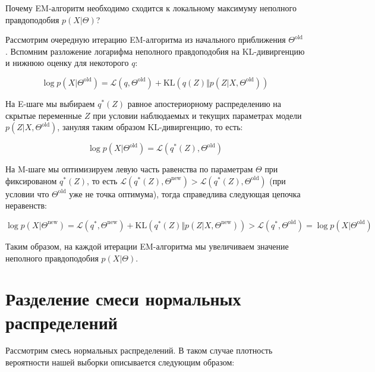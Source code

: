 \documentclass[12pt,a4paper]{article}
\begin{document}
\begin{vkProblem}
    Почему EM-алгоритм необходимо сходится к локальному максимуму неполного правдоподобия $p(X\vert\Theta)$?
\end{vkProblem}
\begin{esSolution}
    Рассмотрим очередную итерацию EM-алгоритма из начального приближения $\Theta^{\text{old}}$. Вспомним разложение логарифма неполного правдоподобия на KL-дивиргенцию и нижнюю оценку для некоторого $q$:
    
    \begin{equation*}
        \log p(X|\Theta^{\text{old}}) = \mathcal{L}(q, \Theta^{\text{old}}) + \text{KL}(q(Z) \Vert p(Z|X, \Theta^{\text{old}}))
    \end{equation*}
    
    На E-шаге мы выбираем $q^*(Z)$ равное апостериорному распределению на скрытые переменные $Z$ при условии наблюдаемых и текущих параметрах модели $p(Z|X, \Theta^{\text{old}})$, зануляя таким образом KL-дивиргенцию, то есть:
    
    \begin{equation*}
        \log p(X|\Theta^{\text{old}}) = \mathcal{L}(q^*(Z), \Theta^{\text{old}})
    \end{equation*}
    
    На M-шаге мы оптимизируем левую часть равенства по параметрам $\Theta$ при фиксированом $q^*(Z)$, то есть $\mathcal{L}(q^*(Z), \Theta^{\text{new}}) > \mathcal{L}(q^*(Z), \Theta^{\text{old}})$ (при условии что $\Theta^{\text{old}}$ уже не точка оптимума), тогда справедлива следующая цепочка неравенств:
    
    \begin{equation*}
        \log p(X|\Theta^{\text{new}}) = \mathcal{L}(q^*, \Theta^{\text{new}}) + \text{KL}(q^*(Z) \Vert p(Z|X, \Theta^{\text{new}}))
        > \mathcal{L}(q^*, \Theta^{\text{old}})
        = \log p(X|\Theta^{\text{old}})
    \end{equation*}
    
    Таким образом, на каждой итерации EM-алгоритма мы увеличиваем значение неполного правдоподобия $p(X\vert\Theta)$.
    
\end{esSolution}

\section{Разделение смеси нормальных распределений}

Рассмотрим смесь нормальных распределений. В таком случае плотность вероятности нашей выборки описывается следующим образом:
\end{document}
